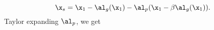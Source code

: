 \begin{equation}
\x_s = \x_1 - \al_g(\x_1) - \al_p(\x_1 - \beta \al_g(\x_1)). 
\end{equation}
Taylor expanding $\al_p$, we get 
\small